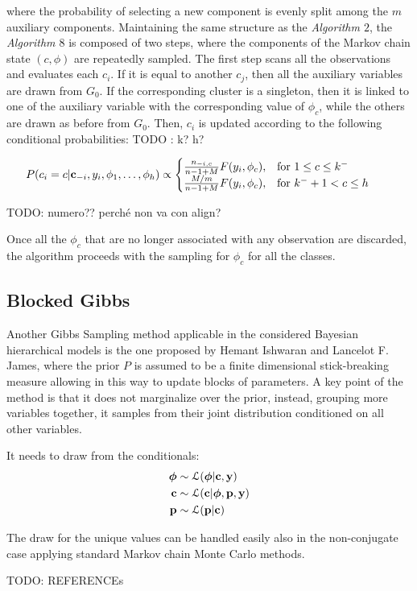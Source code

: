             	
where the probability of selecting a new component is evenly split among the $m$ auxiliary components.
Maintaining the same structure as the \textit{Algorithm $2$}, the \textit{Algorithm $8$} is composed of two steps, where the components of the Markov chain state $(c,\phi)$ are repeatedly sampled. The first step scans all the observations and evaluates each $c_i$. If it is equal to another $c_j$, then all the auxiliary variables are drawn from $G_0$. If the corresponding cluster is a singleton, then it is linked to one of the auxiliary variable with the corresponding value of $\phi_c$, while the others are drawn as before from $G_0$. Then, $c_i$ is updated according to the following conditional probabilities:
TODO : k? h?

\begin{displaymath}
		            	\hspace{-20pt}
		            	P(c_{i}=c | \mathbf c_{-i}, y_{i}, \phi_{1},\dots,\phi_{h}) \propto \begin{cases}  \frac{n_{-i,c}}{n-1+M}F(y_{i},\phi_{c}), & \mbox{for } 1 \leq c \leq k^{-} \\ \frac{M/m}{n-1+M}F(y_{i},\phi_{c}), & \mbox{for } k^{-}+1 < c \leq h
		            	\end{cases}
		            	\vspace{-5pt}
\end{displaymath}

TODO: numero?? perché non va con align?

Once all the $\phi_c$ that are no longer associated with any observation are discarded, the algorithm proceeds with the sampling for $\phi_c$ for all the classes.


\subsection{Blocked Gibbs}
Another Gibbs Sampling method applicable in the considered Bayesian hierarchical models is the one proposed by Hemant Ishwaran and Lancelot F. James, where the prior $P$ is assumed to be a finite dimensional stick-breaking measure allowing in this way to update blocks of parameters. A key point of the method is that it does not marginalize over the prior, instead, grouping more variables together, it samples from their joint distribution conditioned on all other variables. 

It needs to draw from the conditionals:
	\begin{align}
			\boldsymbol\phi &\sim \mathcal L(\boldsymbol\phi | \mathbf{c}, \mathbf{y}) \\
			\mathbf{c} &\sim \mathcal L (\mathbf{c}| \boldsymbol\phi,\mathbf{p}, \mathbf{y}) \\
			\mathbf{p} &\sim \mathcal L (\mathbf{p}| \mathbf{c})
		\end{align}

The draw for the unique values can be handled easily also in the non-conjugate case applying standard Markov chain Monte Carlo methods.


TODO: REFERENCEs